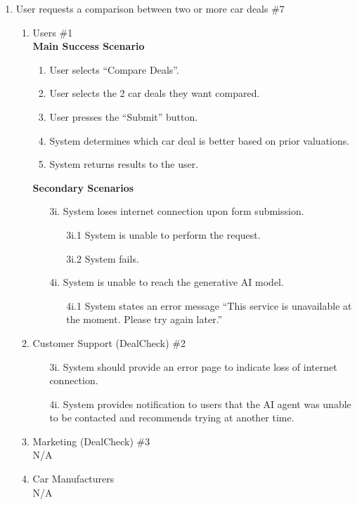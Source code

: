 \documentclass[]{article}
\begin{document}
\begin{enumerate}[{\bf {BE}1.}]
		\item User requests a comparison between two or more car deals \#7
		\begin{enumerate}[{\bf VP1.}]
		  \item Users \#1 \\
			\textbf{Main Success Scenario}
			\begin{enumerate}[1.]
			  \item User selects ``Compare Deals''.
			  \item User selects the 2 car deals they want compared.
			  \item User presses the ``Submit'' button.
			  \item System determines which car deal is better based on prior valuations.
			  \item System returns results to the user.
			\end{enumerate}
			\textbf{Secondary Scenarios}
			\begin{enumerate}
			  \item[3i.] System loses internet connection upon form submission.
			  \begin{enumerate}
				\item[3i.1] System is unable to perform the request.
				\item[3i.2] System fails.
			  \end{enumerate}
			  \item[4i.] System is unable to reach the generative AI model.
			  \begin{enumerate}
				\item[4i.1] System states an error message ``This service is unavailable at the moment. Please try again later.''
			  \end{enumerate}
			\end{enumerate}
		  \item Customer Support (DealCheck) \#2
			\begin{enumerate}
			  \item[3i.] System should provide an error page to indicate loss of internet connection.
			  \item[4i.] System provides notification to users that the AI agent was unable to be contacted and recommends trying at another time.
			\end{enumerate}
		  \item Marketing (DealCheck) \#3 \\ N/A
		  \item Car Manufacturers \\ N/A

\end{enumerate}
\end{enumerate}
\end{document}
